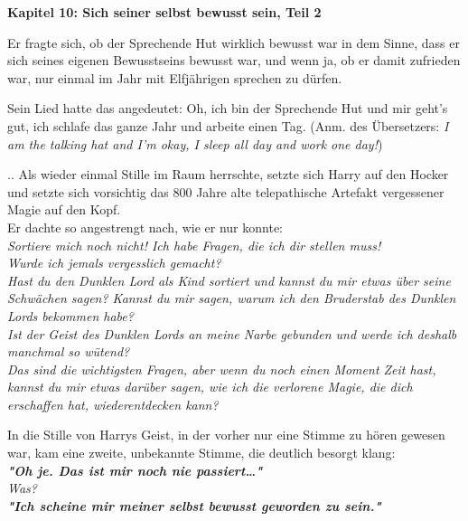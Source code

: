 

\hypertarget{sich-seiner-selbst-bewusst-sein-teil-2}{%

\textbf{Kapitel 10: Sich seiner selbst bewusst sein, Teil 2}

Er fragte sich, ob der Sprechende Hut wirklich bewusst war in dem Sinne, dass er sich seines eigenen Bewusstseins bewusst war, und wenn ja, ob er damit zufrieden war, nur einmal im Jahr mit Elfjährigen sprechen zu dürfen.

Sein Lied hatte das angedeutet: Oh, ich bin der Sprechende Hut und mir geht's gut, ich schlafe das ganze Jahr und arbeite einen Tag. (Anm. des Übersetzers: \emph{I am the talking hat and I'm okay, I sleep all day and work one day!})

.. Als wieder einmal Stille im Raum herrschte, setzte sich Harry auf den Hocker und setzte sich vorsichtig das 800 Jahre alte telepathische Artefakt vergessener Magie auf den Kopf.\\ Er dachte so angestrengt nach, wie er nur konnte:\\ \emph{Sortiere mich noch nicht! Ich habe Fragen, die ich dir stellen muss!\\ Wurde ich jemals vergesslich gemacht?}\\ \emph{Hast du den Dunklen Lord als Kind sortiert und kannst du mir etwas über seine Schwächen sagen? Kannst du mir sagen, warum ich den Bruderstab des Dunklen Lords bekommen habe?}\\ \emph{Ist der Geist des Dunklen Lords an meine Narbe gebunden und werde ich deshalb manchmal so wütend?}\\ \emph{Das sind die wichtigsten Fragen, aber wenn du noch einen Moment Zeit hast, kannst du mir etwas darüber sagen, wie ich die verlorene Magie, die dich erschaffen hat, wiederentdecken kann?}

In die Stille von Harrys Geist, in der vorher nur eine Stimme zu hören gewesen war, kam eine zweite, unbekannte Stimme, die deutlich besorgt klang:\\ \textbf{\emph{"Oh je. Das ist mir noch nie passiert…"}}\\ \emph{Was?}\\ \textbf{\emph{"Ich scheine mir meiner selbst bewusst geworden zu sein."}}

}
